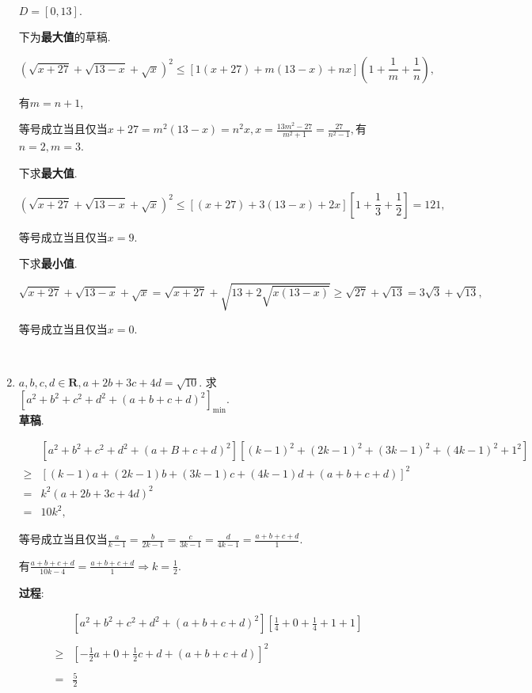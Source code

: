 \documentclass[8pt]{article}
\begin{document}
\begin{enumerate}
			$D=[0, 13].$

			下为\textbf{最大值}的草稿.

			$$
			\left(\sqrt{x+27}+\sqrt{13-x}+\sqrt{x}\right)^2\leq\left[1(x+27)+m(13-x)+nx\right]\left(1+\frac{1}{m}+\frac{1}{n}\right),
			$$

			有$m=n+1$,

			等号成立当且仅当$x+27=m^2(13-x)=n^2x, \displaystyle x=\frac{13m^2-27}{m^2+1}=\frac{27}{n^2-1},$有$n=2, m=3$.

			下求\textbf{最大值}.

			$$\left(\sqrt{x+27}+\sqrt{13-x}+\sqrt{x}\right)^2\leq[(x+27)+3(13-x)+2x]\left[1+\frac{1}{3}+\frac{1}{2}\right]=121,$$

			等号成立当且仅当$x=9$.

			下求\textbf{最小值}.

			$$\sqrt{x+27}+\sqrt{13-x}+\sqrt{x}=\sqrt{x+27}+\sqrt{13+2\sqrt{x(13-x)}}\geq\sqrt{27}+\sqrt{13}=3\sqrt{3}+\sqrt{13},$$

			等号成立当且仅当$x=0$.

		~\\

		\item $a, b, c, d \in \mathbf{R}, a+2b+3c+4d=\sqrt{10}.$ 求$\displaystyle \left[a^2+b^2+c^2+d^2+(a+b+c+d)^2\right]_{\min}.$
			~\\

			\textbf{草稿}.

			$$
			\begin{array}{cl}
			&\left[a^2+b^2+c^2+d^2+(a+B+c+d)^2\right]\left[(k-1)^2+(2k-1)^2+(3k-1)^2+(4k-1)^2+1^2\right]\\
			\geq&\left[(k-1)a+(2k-1)b+(3k-1)c+(4k-1)d+(a+b+c+d)\right]^2\\
			=&k^2(a+2b+3c+4d)^2\\
			=&10k^2,
			\end{array}$$

			等号成立当且仅当$\displaystyle \frac{a}{k-1}=\frac{b}{2k-1}=\frac{c}{3k-1}=\frac{d}{4k-1}=\frac{a+b+c+d}{1}.$

			有$\displaystyle \frac{a+b+c+d}{10k-4}=\frac{a+b+c+d}{1}\Rightarrow k=\frac{1}{2}.$

			\textbf{过程}:

			$$
			\begin{array}{cl}
			&\displaystyle \left[a^2+b^2+c^2+d^2+(a+b+c+d)^2\right]\left[\frac{1}{4}+0+\frac{1}{4}+1+1\right]\\\\
			\geq&\displaystyle \left[-\frac{1}{2}a+0+\frac{1}{2}c+d+(a+b+c+d)\right]^2\\\\
			=&\displaystyle \frac{5}{2}\\
			\end{array}
			$$


\end{enumerate}
\end{document}
